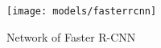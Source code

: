 \documentclass{article}
\begin{document}
\setlength{\parindent}{6ex}

\begin{figure}
    \centering
    \texttt{[image: models/fasterrcnn]}
    \caption{Network of Faster R-CNN}
    \label{fig:fasterrcnn1}
\end{figure}

\indent
\end{document}
